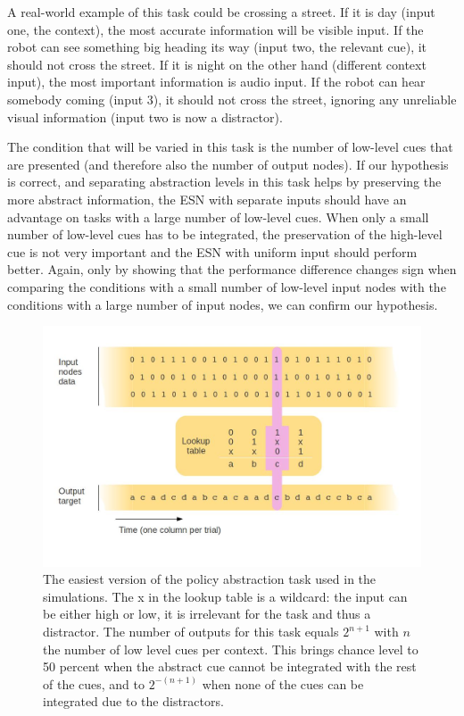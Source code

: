 \documentclass[10pt,a4paper]{report}
\begin{document}
A real-world example of this task could be crossing a street. If it is day (input one, the context), the most accurate information will be visible input. If the robot can see something big heading its way (input two, the relevant cue), it should not cross the street. If it is night on the other hand (different context input), the most important information is audio input. If the robot can hear somebody coming (input 3), it should not cross the street, ignoring any unreliable visual information (input two is now a distractor).

The condition that will be varied in this task is the number of low-level cues that are presented (and therefore also the number of output nodes). If our hypothesis is correct, and separating abstraction levels in this task helps by preserving the more abstract information, the ESN with separate inputs should have an advantage on tasks with a large number of low-level cues. When only a small number of low-level cues has to be integrated, the preservation of the high-level cue is not very important and the ESN with uniform input should perform better. Again, only by showing that the performance difference changes sign when comparing the conditions with a small number of low-level input nodes with the conditions with a large number of input nodes, we can confirm our hypothesis.

\begin{figure}[bthp]
\includegraphics[width=\textwidth]{figures/taskpol.jpg}
\caption{The easiest version of the policy abstraction task used in the simulations. The x in the lookup table is a wildcard: the input can be either high or low, it is irrelevant for the task and thus a distractor. The number of outputs for this task equals $2^{n+1} $ with $ n $ the number of low level cues per context. This brings chance level to 50 percent when the abstract cue cannot be integrated with the rest of the cues, and to $2^{-(n+1)} $ when none of the cues can be integrated due to the distractors.  }
\label{context}
\end{figure}
\end{document}
